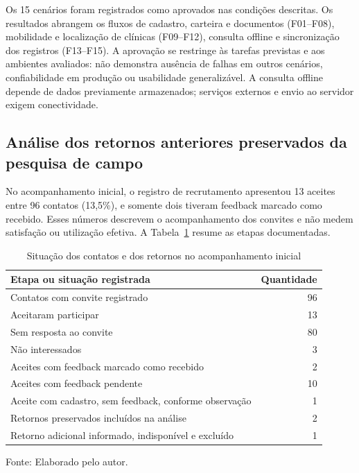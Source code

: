 \documentclass{UNESC}
\begin{document}
Os 15 cenários foram registrados como aprovados nas condições descritas. Os resultados abrangem os fluxos de cadastro, carteira e documentos (F01--F08), mobilidade e localização de clínicas (F09--F12), consulta offline e sincronização dos registros (F13--F15). A aprovação se restringe às tarefas previstas e aos ambientes avaliados: não demonstra ausência de falhas em outros cenários, confiabilidade em produção ou usabilidade generalizável. A consulta offline depende de dados previamente armazenados; serviços externos e envio ao servidor exigem conectividade.

\subsection{Análise dos retornos anteriores preservados da pesquisa de campo}

No acompanhamento inicial, o registro de recrutamento apresentou 13 aceites entre 96 contatos (13,5\%), e somente dois tiveram feedback marcado como recebido. Esses números descrevem o acompanhamento dos convites e não medem satisfação ou utilização efetiva. A Tabela~\ref{tab:recrutamento} resume as etapas documentadas.

\begin{table}[htbp]
\centering
\caption{Situação dos contatos e dos retornos no acompanhamento inicial}
\label{tab:recrutamento}
\small
\setlength{\tabcolsep}{5pt}
\renewcommand{\arraystretch}{1.1}
\begin{tabular}{@{}p{} r@{}}
\hline
\textbf{Etapa ou situação registrada} & \textbf{Quantidade} \\
\hline
Contatos com convite registrado & 96 \\
Aceitaram participar & 13 \\
Sem resposta ao convite & 80 \\
Não interessados & 3 \\
Aceites com feedback marcado como recebido & 2 \\
Aceites com feedback pendente & 10 \\
Aceite com cadastro, sem feedback, conforme observação & 1 \\
Retornos preservados incluídos na análise & 2 \\
Retorno adicional informado, indisponível e excluído & 1 \\
\hline
\end{tabular}
\par\vspace{2pt}
{\footnotesize\raggedright Fonte: Elaborado pelo autor.\par}
\end{table}
\end{document}
